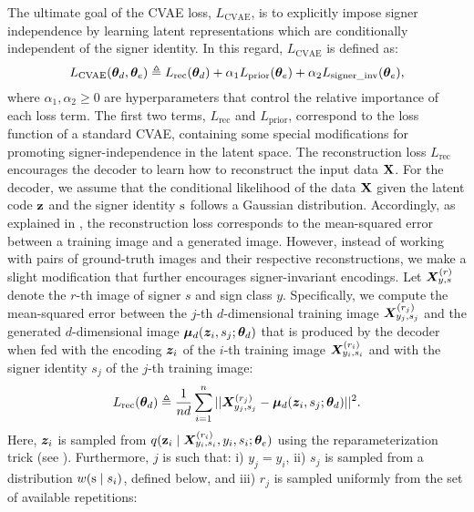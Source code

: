 The ultimate goal of the CVAE loss, $L_{\text{CVAE}}$, is to explicitly impose signer independence by learning latent representations which are conditionally independent of the signer identity. In this regard, $L_{\text{CVAE}}$ is defined as:
\begin{equation}
    L_{\text{CVAE}}({\bm{\theta}}_{d},{\bm{\theta}}_{e}) \triangleq L_{\text{rec}}({\bm{\theta}}_{d}) + \alpha_{1} L_{\text{prior}}({\bm{\theta}}_{e}) + \alpha_{2} L_{\text{signer\_inv}}({\bm{\theta}}_{e}),
\end{equation}
where $\alpha_{1},\alpha_{2}\geq 0$ are hyperparameters that control the relative importance of each loss term. The first two terms, $L_{\text{rec}}$ and $L_{\text{prior}}$, correspond to the loss function of a standard CVAE, containing some special modifications for promoting signer-independence in the latent space. The reconstruction loss $L_{\text{rec}}$ encourages the decoder to learn how to reconstruct the input data ${\mathbf{X}}$. For the decoder, we assume that the conditional likelihood of the data ${\mathbf{X}}$ given the latent code ${\mathbf{z}}$ and the signer identity ${\textnormal{s}}$ follows a Gaussian distribution. Accordingly, as explained in , the reconstruction loss corresponds to the mean-squared error between a training image and a generated image. However, instead of working with pairs of ground-truth images and their respective reconstructions, we make a slight modification that further encourages signer-invariant encodings. Let ${\bm{X}}^{(r)}_{y,s}$ denote the $r$-th image of signer $s$ and sign class $y$. Specifically, we compute the mean-squared error between the $j$-th $d$-dimensional training image ${\bm{X}}^{(r_{j})}_{y_{j},s_{j}}$ and the generated $d$-dimensional image ${\bm{\mu}}_d({\bm{z}}_{i},s_{j}; {\bm{\theta}}_{d})$ that is produced by the decoder when fed with the encoding ${\bm{z}}_{i}$ of the $i$-th training image ${\bm{X}}^{(r_{i})}_{y_{i},s_{i}}$ and with the signer identity $s_j$ of the $j$-th training image:
\begin{equation}
    \label{eq:loss_rec}
    L_{\text{rec}}({\bm{\theta}}_{d}) \triangleq \frac{1}{n d} \sum_{i=1}^{n}||{\bm{X}}^{(r_{j})}_{y_{j},s_{j}}-{\bm{\mu}}_d({\bm{z}}_{i},s_{j}; {\bm{\theta}}_{d})||^2.
\end{equation}
Here, ${\bm{z}}_{i}$ is sampled from $q({\mathbf{z}}_{i} \mid {\bm{X}}^{(r_{i})}_{y_{i},s_{i}}, y_{i}, s_{i}; {\bm{\theta}}_e)$ using the reparameterization trick (see ). Furthermore, $j$ is such that: i) $y_j=y_i$, ii) $s_{j}$ is sampled from a distribution $w({\textnormal{s}} \mid s_{i})$, defined below, and iii) $r_{j}$ is sampled uniformly from the set of available repetitions:
